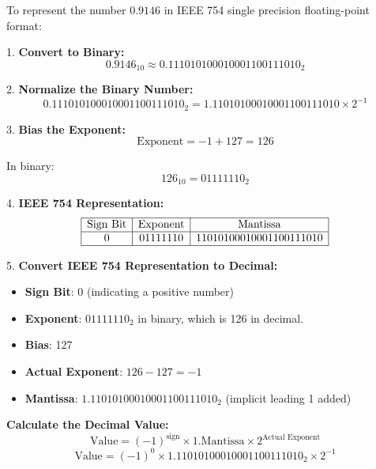     
To represent the number \( 0.9146 \) in IEEE 754 single precision floating-point format:

1. \textbf{Convert to Binary:}
\[
0.9146_{10} \approx 0.111010100010001100111010_2
\]

2. \textbf{Normalize the Binary Number:}
\[
0.111010100010001100111010_2 = 1.11010100010001100111010 \times 2^{-1}
\]

3. \textbf{Bias the Exponent:}
\[
\text{Exponent} = -1 + 127 = 126
\]

In binary:
\[
126_{10} = 01111110_2
\]

4. \textbf{IEEE 754 Representation:}
\begin{equation}
    \begin{array}{|c|c|c|}
        \hline
        \text{Sign Bit} & \text{Exponent} & \text{Mantissa} \\
        \hline
        0 & 01111110 & 11010100010001100111010 \\
        \hline
    \end{array}
\end{equation}

5. \textbf{Convert IEEE 754 Representation to Decimal:}
\begin{itemize}
    \item \textbf{Sign Bit}: 0 (indicating a positive number)
    \item \textbf{Exponent}: \(01111110_2\) in binary, which is 126 in decimal.
    \item \textbf{Bias}: 127
    \item \textbf{Actual Exponent}: \(126 - 127 = -1\)
    \item \textbf{Mantissa}: \(1.11010100010001100111010_2\) (implicit leading 1 added)
\end{itemize}

\textbf{Calculate the Decimal Value:}
\[
\text{Value} = (-1)^{\text{sign}} \times 1.\text{Mantissa} \times 2^{\text{Actual Exponent}}
\]
\[
\text{Value} = (-1)^0 \times 1.11010100010001100111010_2 \times 2^{-1}
\]

